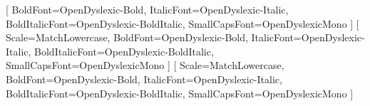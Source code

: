 \usepackage[french]{babel}
\usepackage[utf8x]{inputenc} %
\usepackage{xspace} %
\usepackage{lmodern} %

\usepackage{ifxetex}
\ifxetex
    \usepackage{fontspec}
    \setmainfont{OpenDyslexic}
    [
      BoldFont=OpenDyslexic-Bold,
      ItalicFont=OpenDyslexic-Italic,
      BoldItalicFont=OpenDyslexic-BoldItalic,
      SmallCapsFont=OpenDyslexicMono
    ]
    \setsansfont{OpenDyslexic}[
      Scale=MatchLowercase,
      BoldFont=OpenDyslexic-Bold,
      ItalicFont=OpenDyslexic-Italic,
      BoldItalicFont=OpenDyslexic-BoldItalic,
      SmallCapsFont=OpenDyslexicMono
    ]
    \setmonofont{OpenDyslexicMono}[
      Scale=MatchLowercase,
      BoldFont=OpenDyslexic-Bold,
      ItalicFont=OpenDyslexic-Italic,
      BoldItalicFont=OpenDyslexic-BoldItalic,
      SmallCapsFont=OpenDyslexicMono
    ]
\else
    \usepackage[T1]{fontenc}
\fi

\usepackage{amsmath, amsfonts} %
\usepackage{latexsym}

\usepackage{amsthm}

\usepackage{authoraftertitle}

\usepackage{datetime}

\usepackage{hyperref}
\usepackage{bookmark}

\usepackage{graphicx}
\usepackage{subcaption} %

\usepackage{tabularx}
\usepackage{multirow} %
\usepackage{multicol} %
\usepackage[table]{xcolor}
\usepackage{longtable} %
\usepackage{array} %

\usepackage{float} %

\usepackage{xcolor}






\usepackage{magictex}
